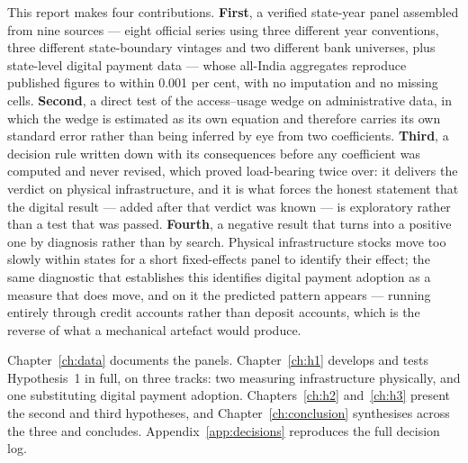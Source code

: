 This report makes four contributions. \textbf{First}, a verified state-year panel assembled from
nine sources --- eight official series using three different year conventions, three different
state-boundary vintages and two different bank universes, plus state-level digital payment data ---
whose all-India aggregates reproduce published figures to within 0.001 per cent, with no imputation
and no missing cells. \textbf{Second}, a direct test of the access--usage wedge on administrative
data, in which the wedge is estimated as its own equation and therefore carries its own standard
error rather than being inferred by eye from two coefficients. \textbf{Third}, a decision rule
written down with its consequences before any coefficient was computed and never revised, which
proved load-bearing twice over: it delivers the verdict on physical infrastructure, and it is what
forces the honest statement that the digital result --- added after that verdict was known --- is
exploratory rather than a test that was passed. \textbf{Fourth}, a negative result that turns into
a positive one by diagnosis rather than by search. Physical infrastructure stocks move too slowly
within states for a short fixed-effects panel to identify their effect; the same diagnostic that
establishes this identifies digital payment adoption as a measure that does move, and on it the
predicted pattern appears --- running entirely through credit accounts rather than deposit
accounts, which is the reverse of what a mechanical artefact would produce.

\medskip
\noindent
Chapter~\ref{ch:data} documents the panels. Chapter~\ref{ch:h1} develops and tests Hypothesis~1 in
full, on three tracks: two measuring infrastructure physically, and one substituting digital
payment adoption. Chapters~\ref{ch:h2} and~\ref{ch:h3} present the second and third hypotheses, and
Chapter~\ref{ch:conclusion} synthesises across the three and concludes.
Appendix~\ref{app:decisions} reproduces the full decision log.
